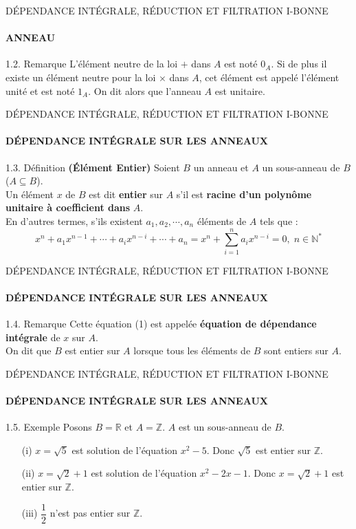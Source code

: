 \documentclass[11pt,a4paper]{beamer}
\begin{document}
\begin{frame}{DÉPENDANCE INTÉGRALE, RÉDUCTION ET FILTRATION I-BONNE}
	\framesubtitle{ANNEAU}
	\begin{alertblock}{1.2. Remarque}
		L'élément neutre de la loi $+$ dans $A$ est noté $0_A$. Si de plus il existe un élément neutre pour la loi $\times$ dans $A$, cet élément est appelé l'élément unité et est noté $1_A$. On dit alors que l'anneau $A$ est unitaire.
	\end{alertblock}
\end{frame}

\begin{frame}{DÉPENDANCE INTÉGRALE, RÉDUCTION ET FILTRATION I-BONNE}
	\framesubtitle{DÉPENDANCE INTÉGRALE SUR LES ANNEAUX}
	\begin{block}{1.3. Définition \textbf{(Élément Entier)}}
		Soient $B$ un anneau et $A$ un sous-anneau de $B$ ($A \subseteq B$).\\
		Un élément $x$ de $B$ est dit \textbf{entier} sur $A$ s'il est \textbf{racine d'un polynôme unitaire à coefficient dans} $A$.\\
		En d'autres termes, s'ils existent $a_1, a_2, \cdots , a_n$ éléments de $A$ tels que :\\
		\begin{equation}
			x^n + a_1 x^{n-1} +\cdots+a_i x^{n-i} +\cdots + a_n = x^n + \sum_{i=1}^{n} a_i x^{n-i} = 0, \; n \in \mathbb{N^*}
		\end{equation}
	\end{block}
\end{frame}

\begin{frame}{DÉPENDANCE INTÉGRALE, RÉDUCTION ET FILTRATION I-BONNE}
	\framesubtitle{DÉPENDANCE INTÉGRALE SUR LES ANNEAUX}
	\begin{alertblock}{1.4. Remarque}
	Cette équation (1) est appelée \textbf{équation de dépendance intégrale} de $x$ sur $A$.\\
	On dit que $B$ est entier sur $A$ lorsque tous les éléments de $B$ sont entiers sur $A$.
	\end{alertblock}
\end{frame}

\begin{frame}{DÉPENDANCE INTÉGRALE, RÉDUCTION ET FILTRATION I-BONNE}
	\framesubtitle{DÉPENDANCE INTÉGRALE SUR LES ANNEAUX}
	\begin{block}{1.5. Exemple}
		Posons $B = \mathbb{R}$ et $A = \mathbb{Z}$. $A$ est un sous-anneau de $B$.
		\begin{enumerate}
			\item[(i)] $x = \sqrt{5}$ est solution de l'équation $x^2 - 5$. Donc $\sqrt{5}$ est entier sur $\mathbb{Z}$. \pause
			\item[(ii)] $x = \sqrt{2}+1$ est solution de l'équation $x^2 - 2x -1$. Donc $x = \sqrt{2}+1$ est entier sur $\mathbb{Z}$. \pause
			\item[(iii)]$\dfrac{1}{2}$ n'est pas entier sur $\mathbb{Z}$.
		\end{enumerate}
	\end{block}
\end{frame}
\end{document}
